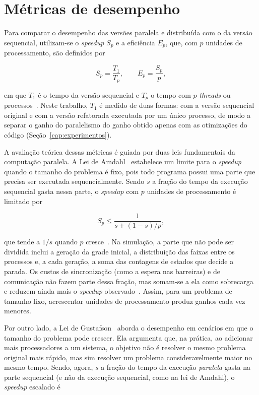 \section{Métricas de desempenho}\label{sec:metricas}

Para comparar o desempenho das versões paralela e distribuída com o da versão sequencial, utilizam-se o \textit{speedup} $S_p$ e a eficiência $E_p$, que, com $p$ unidades de processamento, são definidos por

\begin{equation}
    S_p = \frac{T_1}{T_p}, \qquad E_p = \frac{S_p}{p},
\end{equation}

\noindent em que $T_1$ é o tempo da versão sequencial e $T_p$ o tempo com $p$ \textit{threads} ou processos~\cite{Pacheco2011,Eijkhout2016}. Neste trabalho, $T_1$ é medido de duas formas: com a versão sequencial original e com a versão refatorada executada por um único processo, de modo a separar o ganho do paralelismo do ganho obtido apenas com as otimizações do código (Seção~\ref{cap:experimentos}).

A avaliação teórica dessas métricas é guiada por duas leis fundamentais da computação paralela. A Lei de Amdahl~\cite{Amdahl1967} estabelece um limite para o \textit{speedup} quando o tamanho do problema é fixo, pois todo programa possui uma parte que precisa ser executada sequencialmente. Sendo $s$ a fração do tempo da execução sequencial gasta nessa parte, o \textit{speedup} com $p$ unidades de processamento é limitado por

\begin{equation}\label{eq:amdahl}
    S_p \leq \frac{1}{s + (1-s)/p},
\end{equation}

\noindent que tende a $1/s$ quando $p$ cresce~\cite{Eijkhout2016}. Na simulação, a parte que não pode ser dividida inclui a geração da grade inicial, a distribuição das faixas entre os processos e, a cada geração, a soma das contagens de estados que decide a parada. Os custos de sincronização (como a espera nas barreiras) e de comunicação não fazem parte dessa fração, mas somam-se a ela como sobrecarga e reduzem ainda mais o \textit{speedup} observado~\cite{Eijkhout2016}. Assim, para um problema de tamanho fixo, acrescentar unidades de processamento produz ganhos cada vez menores.

Por outro lado, a Lei de Gustafson~\cite{Gustafson1988} aborda o desempenho em cenários em que o tamanho do problema pode crescer. Ela argumenta que, na prática, ao adicionar mais processadores a um sistema, o objetivo não é resolver o mesmo problema original mais rápido, mas sim resolver um problema consideravelmente maior no mesmo tempo. Sendo, agora, $s$ a fração do tempo da execução \emph{paralela} gasta na parte sequencial (e não da execução sequencial, como na lei de Amdahl), o \textit{speedup} escalado é

